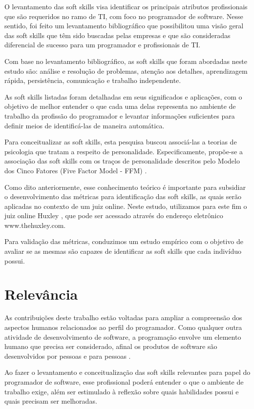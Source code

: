 O levantamento das soft skills visa identificar os principais atributos profissionais que são requeridos no ramo de TI, com foco no programador de software. Nesse sentido, foi feito um levantamento bibliográfico que possibilitou uma visão geral das soft skills que têm sido buscadas pelas empresas e que são consideradas diferencial de sucesso para um programador e profissionais de TI.

Com base no levantamento bibliográfico, as soft skills que foram abordadas neste estudo são: análise e resolução de problemas, atenção aos detalhes, aprendizagem rápida, persistência, comunicação e trabalho independente. 

As soft skills listadas foram detalhadas em seus significados e aplicações, com o objetivo de melhor entender o que cada uma delas representa no ambiente de trabalho da profissão do programador e levantar informações suficientes para definir meios de identificá-las de maneira automática.

Para conceitualizar as soft skills, esta pesquisa buscou associá-las a teorias de psicologia que tratam a respeito de personalidade. Especificamente, propõe-se a associação das soft skills com os traços de personalidade descritos pelo Modelo dos Cinco Fatores (Five Factor Model - FFM) \cite{mccrae:92}. 

Como dito anteriormente, esse conhecimento teórico é importante para subsidiar o desenvolvimento das métricas para identificação das soft skills, as quais serão aplicadas no contexto de um juiz online. Neste estudo, utilizamos para este fim o juiz online Huxley \cite{paes:13}, que pode ser acessado através do endereço eletrônico www.thehuxley.com.

Para validação das métricas, conduzimos um estudo empírico com o objetivo de avaliar se as mesmas são capazes de identificar as soft skills que cada indivíduo possui.

\section{Relevância}

As contribuições deste trabalho estão voltadas para ampliar a compreensão dos aspectos humanos relacionados ao perfil do programador. Como qualquer outra atividade de desenvolvimento de software, a programação envolve um elemento humano que precisa ser considerado, afinal os produtos de software são desenvolvidos por pessoas e para pessoas \cite{john:05}.

Ao fazer o levantamento e conceitualização das soft skills relevantes para papel do programador de software, esse profissional poderá entender o que o ambiente de trabalho exige, além ser estimulado à reflexão sobre quais habilidades possui e quais precisam ser melhoradas.

